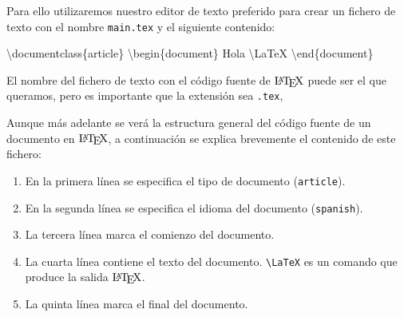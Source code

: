 \documentclass[
  a4paper,
]{scrreport}
\newenvironment{Shaded}{\begin{snugshade}}{\end{snugshade}}
\newcommand{\BuiltInTok}[1]{\textcolor[rgb]{0.00,0.23,0.31}{#1}}
\newcommand{\ExtensionTok}[1]{\textcolor[rgb]{0.00,0.23,0.31}{#1}}
\newcommand{\FunctionTok}[1]{\textcolor[rgb]{0.28,0.35,0.67}{#1}}
\newcommand{\KeywordTok}[1]{\textcolor[rgb]{0.00,0.23,0.31}{#1}}
\newcommand{\NormalTok}[1]{\textcolor[rgb]{0.00,0.23,0.31}{#1}}
\providecommand{\tightlist}{%
  \setlength{\itemsep}{0pt}\setlength{\parskip}{0pt}}\usepackage{longtable,booktabs,array}
\begin{document}
Para ello utilizaremos nuestro editor de texto preferido para crear un
fichero de texto con el nombre \texttt{main.tex} y el siguiente
contenido:

\begin{Shaded}
\begin{Highlighting}[]
\BuiltInTok{\textbackslash{}documentclass}\NormalTok{\{}\ExtensionTok{article}\NormalTok{\}}
\KeywordTok{\textbackslash{}begin}\NormalTok{\{}\ExtensionTok{document}\NormalTok{\}}
\NormalTok{Hola }\FunctionTok{\textbackslash{}LaTeX}
\KeywordTok{\textbackslash{}end}\NormalTok{\{}\ExtensionTok{document}\NormalTok{\}}
\end{Highlighting}
\end{Shaded}

\begin{tcolorbox}[enhanced jigsaw, bottomrule=.15mm, leftrule=.75mm, opacityback=0, titlerule=0mm, bottomtitle=1mm, colbacktitle=quarto-callout-important-color!10!white, arc=.35mm, toprule=.15mm, colframe=quarto-callout-important-color-frame, title=\textcolor{quarto-callout-important-color}{\faExclamation}\hspace{0.5em}{Importante}, coltitle=black, colback=white, breakable, toptitle=1mm, rightrule=.15mm, left=2mm, opacitybacktitle=0.6]

El nombre del fichero de texto con el código fuente de \(\text{\LaTeX}\)
puede ser el que queramos, pero es importante que la extensión sea
\texttt{.tex},

\end{tcolorbox}

Aunque más adelante se verá la estructura general del código fuente de
un documento en \(\text{\LaTeX}\), a continuación se explica brevemente
el contenido de este fichero:

\begin{enumerate}
\def\labelenumi{\arabic{enumi}.}
\tightlist
\item
  En la primera línea se especifica el tipo de documento
  (\texttt{article}).
\item
  En la segunda línea se especifica el idioma del documento
  (\texttt{spanish}).
\item
  La tercera línea marca el comienzo del documento.
\item
  La cuarta línea contiene el texto del documento.
  \texttt{\textbackslash{}LaTeX} es un comando que produce la salida
  \(\text{\LaTeX}\).
\item
  La quinta línea marca el final del documento.
\end{enumerate}
\end{document}
